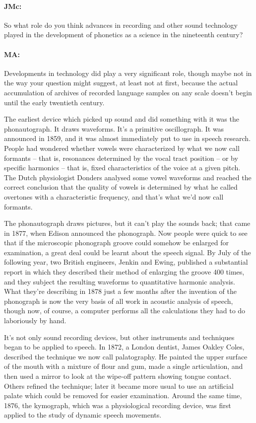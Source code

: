 \documentclass[output=paper]{langscibook}
\begin{document}
\paragraph*{JMc:} So what role do you think advances in recording and other sound technology played in the development of phonetics as a science in the nineteenth century?

\paragraph*{MA:} \begin{sloppypar}Developments in technology did play a very significant role, though maybe not in the way your question might suggest, at least not at first, because the actual accumulation of archives of recorded language samples on any scale doesn’t begin until the early twentieth century.\end{sloppypar}

The earliest device which picked up sound and did something with it was the phonautograph. It draws waveforms. It’s a primitive oscillograph. It was announced in 1859, and it was almost immediately put to use in speech research. People had wondered whether vowels were characterized by what we now call formants – that is, resonances determined by the vocal tract position – or by specific harmonics – that is, fixed characteristics of the voice at a given pitch. The Dutch physiologist Donders analysed some vowel waveforms and reached the correct conclusion that the quality of vowels is determined by what he called overtones with a characteristic frequency, and that’s what we’d now call formants. 

The phonautograph draws pictures, but it can’t play the sounds back; that came in 1877, when Edison announced the phonograph. Now people were quick to see that if the microscopic phonograph groove could somehow be enlarged for examination, a great deal could be learnt about the speech signal. By July of the following year, two British engineers, Jenkin and Ewing, published a substantial report in which they described their method of enlarging the groove 400 times, and they subject the resulting waveforms to quantitative harmonic analysis. What they’re describing in 1878 just a few months after the invention of the phonograph is now the very basis of all work in acoustic analysis of speech, though now, of course, a computer performs all the calculations they had to do laboriously by hand.

It’s not only sound recording devices, but other instruments and techniques began to be applied to speech. In 1872, a London dentist, James Oakley Coles, described the technique we now call palatography. He painted the upper surface of the mouth with a mixture of flour and gum, made a single articulation, and then used a mirror to look at the wipe-off pattern showing tongue contact. Others refined the technique; later it became more usual to use an artificial palate which could be removed for easier examination. Around the same time, 1876, the kymograph, which was a physiological recording device, was first applied to the study of dynamic speech movements.
\end{document}
